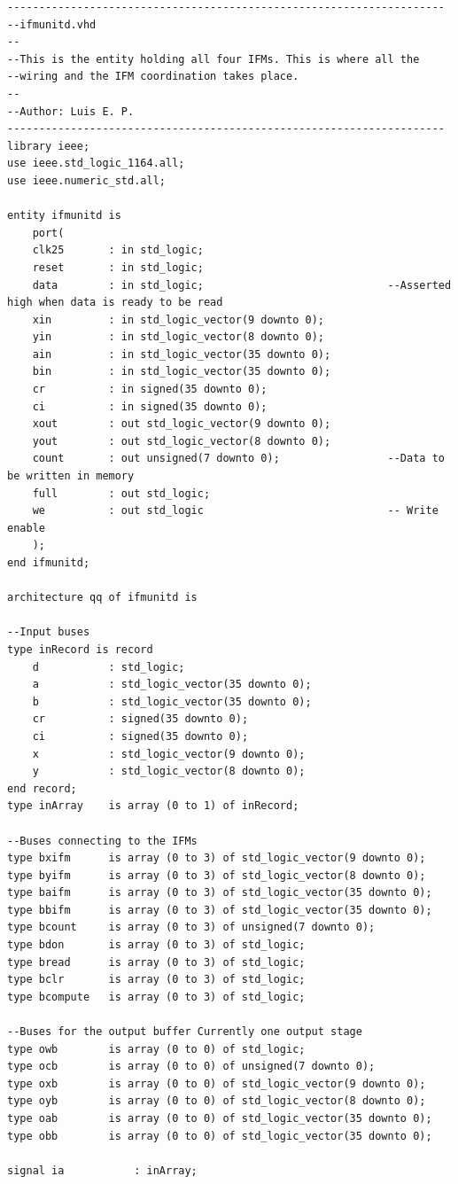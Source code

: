 \documentclass{article}
\begin{document}
\begin{lstlisting}
---------------------------------------------------------------------
--ifmunitd.vhd
--
--This is the entity holding all four IFMs. This is where all the
--wiring and the IFM coordination takes place.
--
--Author: Luis E. P.
---------------------------------------------------------------------
library ieee;
use ieee.std_logic_1164.all;
use ieee.numeric_std.all;

entity ifmunitd is
	port(
	clk25		: in std_logic;
	reset		: in std_logic;
	data		: in std_logic;								--Asserted high when data is ready to be read
	xin			: in std_logic_vector(9 downto 0);
	yin			: in std_logic_vector(8 downto 0);
	ain			: in std_logic_vector(35 downto 0);
	bin			: in std_logic_vector(35 downto 0);
	cr			: in signed(35 downto 0);
	ci			: in signed(35 downto 0);
	xout		: out std_logic_vector(9 downto 0);
	yout		: out std_logic_vector(8 downto 0);
	count		: out unsigned(7 downto 0);					--Data to be written in memory
	full		: out std_logic;
	we			: out std_logic								-- Write enable
	);
end ifmunitd;

architecture qq of ifmunitd is

--Input buses
type inRecord is record
	d			: std_logic;
	a			: std_logic_vector(35 downto 0);
	b			: std_logic_vector(35 downto 0);
	cr			: signed(35 downto 0);
	ci			: signed(35 downto 0);
	x			: std_logic_vector(9 downto 0);
	y			: std_logic_vector(8 downto 0);
end record;
type inArray	is array (0 to 1) of inRecord;

--Buses connecting to the IFMs
type bxifm		is array (0 to 3) of std_logic_vector(9 downto 0);
type byifm		is array (0 to 3) of std_logic_vector(8 downto 0);
type baifm		is array (0 to 3) of std_logic_vector(35 downto 0);
type bbifm		is array (0 to 3) of std_logic_vector(35 downto 0);
type bcount		is array (0 to 3) of unsigned(7 downto 0);
type bdon		is array (0 to 3) of std_logic;
type bread		is array (0 to 3) of std_logic;
type bclr		is array (0 to 3) of std_logic;
type bcompute	is array (0 to 3) of std_logic;

--Buses for the output buffer Currently one output stage
type owb		is array (0 to 0) of std_logic;
type ocb		is array (0 to 0) of unsigned(7 downto 0);
type oxb		is array (0 to 0) of std_logic_vector(9 downto 0);
type oyb		is array (0 to 0) of std_logic_vector(8 downto 0);
type oab		is array (0 to 0) of std_logic_vector(35 downto 0);
type obb		is array (0 to 0) of std_logic_vector(35 downto 0);

signal ia			: inArray;


\end{lstlisting}
\end{document}
